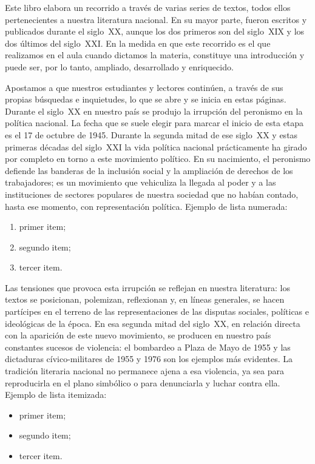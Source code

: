 Este libro elabora un recorrido a través de varias series de textos, todos ellos pertenecientes a nuestra literatura nacional. En su mayor parte, fueron escritos y publicados durante el siglo~XX, aunque los dos primeros son del siglo~XIX y los dos últimos del siglo~XXI. En la medida en que este recorrido es el que realizamos en el aula cuando dictamos la materia, constituye una introducción y puede ser, por lo tanto, ampliado, desarrollado y enriquecido.

Apostamos a que nuestros estudiantes y lectores continúen, a través de sus propias búsquedas e inquietudes, lo que se abre y se inicia en estas páginas. Durante el siglo~XX en nuestro país se produjo la irrupción del peronismo en la política nacional. La fecha que se suele elegir para marcar el inicio de esta etapa es el 17 de octubre de 1945. Durante la segunda mitad de ese siglo~XX y estas primeras décadas del siglo~XXI la vida política nacional prácticamente ha girado por completo en torno a este movimiento político. En su nacimiento, el peronismo defiende las banderas de la inclusión social y la ampliación de derechos de los trabajadores; es un movimiento que vehiculiza la llegada al poder y a las instituciones de sectores populares de nuestra sociedad que no habían contado, hasta ese momento, con representación política. Ejemplo de lista numerada:

\begin{enumerate}
	\item primer item;
	\item segundo item;
	\item tercer item.
\end{enumerate}

Las tensiones que provoca esta irrupción se reflejan en nuestra literatura: los textos se posicionan, polemizan, reflexionan y, en líneas generales, se hacen partícipes en el terreno de las representaciones de las disputas sociales, políticas e ideológicas de la época. En esa segunda mitad del siglo~XX, en relación directa con la aparición de este nuevo movimiento, se producen en nuestro país constantes sucesos de violencia: el bombardeo a Plaza de Mayo de 1955 y las dictaduras cívico-militares de 1955 y 1976 son los ejemplos más evidentes. La tradición literaria nacional no permanece ajena a esa violencia, ya sea para reproducirla en el plano simbólico o para denunciarla y luchar contra ella. Ejemplo de lista itemizada:

\begin{itemize}
	\item primer item;
	\item segundo item;
	\item tercer item.
\end{itemize}

